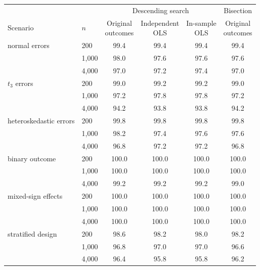\begin{tabular}{llcccc}
\toprule
& & \multicolumn{3}{c}{Descending search} & Bisection \\
\cmidrule(lr){3-5}\cmidrule(lr){6-6}
Scenario & $n$ & \makecell{Original\\outcomes} & \makecell{Independent\\OLS} & \makecell{In-sample\\OLS} & \makecell{Original\\outcomes} \\
\midrule
normal errors & 200 & 99.4 & 99.4 & 99.4 & 99.4 \\
 & 1,000 & 98.0 & 97.6 & 97.6 & 97.6 \\
 & 4,000 & 97.0 & 97.2 & 97.4 & 97.0 \\
$t_3$ errors & 200 & 99.0 & 99.2 & 99.2 & 99.0 \\
 & 1,000 & 97.2 & 97.8 & 97.8 & 97.2 \\
 & 4,000 & 94.2 & 93.8 & 93.8 & 94.2 \\
heteroskedastic errors & 200 & 99.8 & 99.8 & 99.8 & 99.8 \\
 & 1,000 & 98.2 & 97.4 & 97.6 & 97.6 \\
 & 4,000 & 96.8 & 97.2 & 97.2 & 96.8 \\
binary outcome & 200 & 100.0 & 100.0 & 100.0 & 100.0 \\
 & 1,000 & 100.0 & 100.0 & 100.0 & 100.0 \\
 & 4,000 & 99.2 & 99.2 & 99.2 & 99.0 \\
mixed-sign effects & 200 & 100.0 & 100.0 & 100.0 & 100.0 \\
 & 1,000 & 100.0 & 100.0 & 100.0 & 100.0 \\
 & 4,000 & 100.0 & 100.0 & 100.0 & 100.0 \\
stratified design & 200 & 98.6 & 98.2 & 98.0 & 98.2 \\
 & 1,000 & 96.8 & 97.0 & 97.0 & 96.6 \\
 & 4,000 & 96.4 & 95.8 & 95.8 & 96.2 \\
\bottomrule
\end{tabular}
